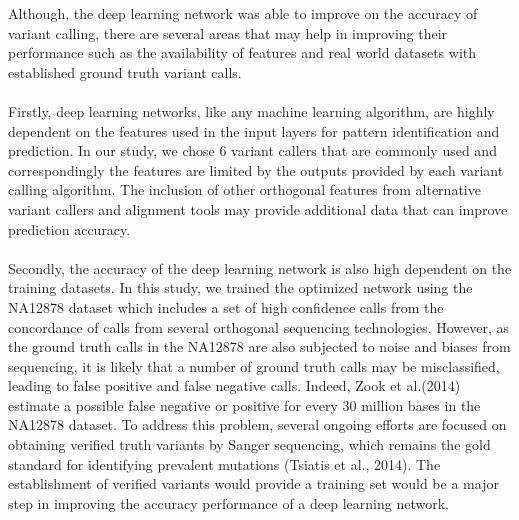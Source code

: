 \documentclass{article}
\begin{document}
Although, the deep learning network was able to improve on the accuracy of variant calling, there are several areas that may help in improving their performance such as the availability of features and real world datasets with established ground truth variant calls.\\\\
Firstly, deep learning networks, like any machine learning algorithm, are highly dependent on the features used in the input layers for pattern identification and prediction. In our study, we chose 6 variant callers that are commonly used and correspondingly the features are limited by the outputs provided by each variant calling algorithm. The inclusion of other orthogonal features from alternative variant callers and alignment tools may provide additional data that can improve prediction accuracy.\\\\
Secondly, the accuracy of the deep learning network is also high dependent on the training datasets. In this study, we trained the optimized network using the NA12878 dataset which includes a set of high confidence calls from the concordance of calls from several orthogonal sequencing technologies. However, as the ground truth calls in the NA12878 are also subjected to noise and biases from sequencing, it is likely that a number of ground truth calls may be misclassified, leading to false positive and false negative calls. Indeed, Zook et al.(2014)  estimate a possible false negative or positive for every 30 million bases in the NA12878 dataset. To address this problem, several ongoing efforts are focused on obtaining verified truth variants by Sanger sequencing, which remains the gold standard for identifying prevalent mutations (Tsiatis et al., 2014). The establishment of verified variants would provide a training set would be a major step in improving the accuracy performance of a deep learning network.
\end{document}
